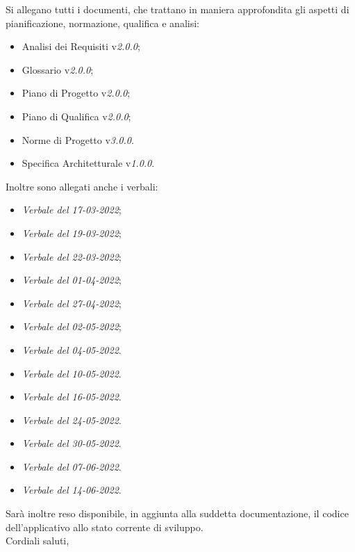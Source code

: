\documentclass[a4paper, 12pt]{letter}
\begin{document}
\begin{letter}
        Si allegano tutti i documenti, che trattano in maniera approfondita gli aspetti di pianificazione, normazione, qualifica e analisi:
        \begin{itemize}
        	\item Analisi dei Requisiti v\textit{2.0.0};
            \item Glossario v\textit{2.0.0};
            \item Piano di Progetto v\textit{2.0.0};
            \item Piano di Qualifica v\textit{2.0.0};
            \item Norme di Progetto v\textit{3.0.0}.
            \item Specifica Architetturale v\textit{1.0.0}.
        \end{itemize}
        Inoltre sono allegati anche i verbali:
        \begin{itemize}
            \item \textit{Verbale del 17-03-2022};
            \item \textit{Verbale del 19-03-2022};
            \item \textit{Verbale del 22-03-2022};
            \item \textit{Verbale del 01-04-2022};
            \item \textit{Verbale del 27-04-2022};
            \item \textit{Verbale del 02-05-2022};
            \item \textit{Verbale del 04-05-2022}.
            \item \textit{Verbale del 10-05-2022}.
            \item \textit{Verbale del 16-05-2022}.
            \item \textit{Verbale del 24-05-2022}.
            \item \textit{Verbale del 30-05-2022}.
            \item \textit{Verbale del 07-06-2022}.
            \item \textit{Verbale del 14-06-2022}.
        \end{itemize}
        Sarà inoltre reso disponibile, in aggiunta alla suddetta documentazione, il codice dell'applicativo allo stato corrente di sviluppo. \\
        Cordiali saluti,
        \begin{flushright}

\end{flushright}
\end{letter}
\end{document}
